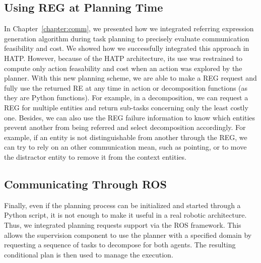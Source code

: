 \documentclass[a4paper,11pt,twoside]{StyleThese}
\begin{document}
\subsection{Using REG at Planning Time}
In Chapter~\ref{chapter:comm}, we presented how we integrated referring expression generation algorithm during task planning to precisely evaluate communication feasibility and cost. We showed how we successfully integrated this approach in HATP. However, because of the HATP architecture, its use was restrained to compute only action feasability and cost when an action was explored by the planner.
With this new planning scheme, we are able to make a REG request and fully use the returned RE at any time in action or decomposition functions (as they are Python functions). For example, in a decomposition, we can request a REG for multiple entities and return sub-tasks concerning only the least costly one. 
Besides, we can also use the REG failure information to know which entities prevent another from being referred and select decomposition accordingly. For example, if an entity is not distinguishable from another through the REG, we can try to rely on an other communication mean, such as pointing, or to move the distractor entity to remove it from the context entities.

\subsection{Communicating Through ROS}
Finally, even if the planning process can be initialized and started through a Python script, it is not enough to make it useful in a real robotic architecture. Thus, we integrated planning requests support via the ROS framework. This allows the supervision component to use the planner with a specified domain by requesting a sequence of tasks to decompose for both agents. The resulting conditional plan is then used to manage the execution.
\end{document}
